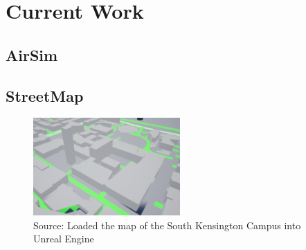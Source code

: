 \section{Current Work}
\subsection{AirSim}

\subsection{StreetMap}

\begin{figure}[H]
    \centering
    \includegraphics[width=0.5\textwidth]{04_Implementation/Map.png}
    \caption{Source: Loaded the map of the South Kensington Campus into Unreal Engine}
\end{figure}